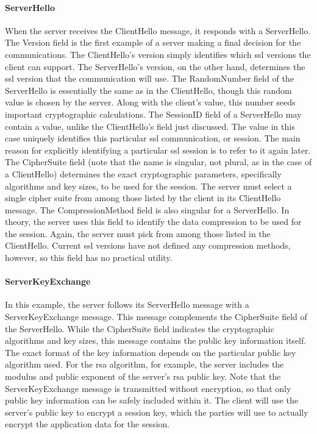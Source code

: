 \paragraph*{ServerHello}
When the server receives the ClientHello message, it responds with a
ServerHello. 
The Version field is the first example of a server making a final 
decision for the communications. The ClientHello’s version simply identifies 
which ssl versions the client can support. The ServerHello’s
version, on the other hand, determines the ssl version that the communication
 will use. 
The RandomNumber field of the ServerHello is essentially the same
as in the ClientHello, though this random value is chosen by the
server. Along with the client’s value, this number seeds important
cryptographic calculations. 
The SessionID field of a ServerHello may contain a value, unlike the
ClientHello’s field just discussed. The value in this case uniquely
identifies this particular ssl communication, or session. The main reason for 
explicitly identifying a particular ssl session is to refer to it
again later.
The CipherSuite field (note that the name is singular, not plural, as in
the case of a ClientHello) determines the exact cryptographic parameters, 
specifically algorithms and key sizes, to be used for the session. 
The server must select a single cipher suite from among those
listed by the client in its ClientHello message.
The CompressionMethod field is also singular for a ServerHello. In
theory, the server uses this field to identify the data compression to
be used for the session. Again, the server must pick from among
those listed in the ClientHello. Current ssl versions have not defined
any compression methods, however, so this field has no practical utility.

\paragraph*{ServerKeyExchange}
In this example, the server follows its ServerHello message with a
ServerKeyExchange message. This message complements the CipherSuite field 
of the ServerHello. While the CipherSuite field indicates
the cryptographic algorithms and key sizes, this message contains the
public key information itself. The exact format of the key information depends
 on the particular public key algorithm used. For the rsa
algorithm, for example, the server includes the modulus and public
exponent of the server’s rsa public key.
Note that the ServerKeyExchange message is transmitted without
encryption, so that only public key information can be safely included within it.
 The client will use the server’s public key to encrypt
a session key, which the parties will use to actually encrypt the application
 data for the session.
